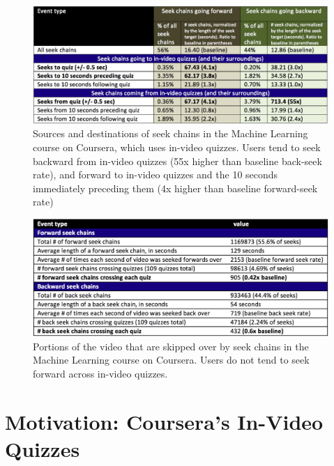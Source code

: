 \documentclass{sigchi}
\begin{document}
\begin{figure}
\includegraphics[width=1.0\columnwidth]{seek-sources-and-destinations-short}
\caption{Sources and destinations of seek chains in the Machine Learning course on Coursera, which uses in-video quizzes. Users tend to seek backward from in-video quizzes (55x higher than baseline back-seek rate), and forward to in-video quizzes and the 10 seconds immediately preceding them (4x higher than baseline forward-seek rate)}
\label{fig:seek-sources-and-destinations-short}
\end{figure}

\begin{figure}[h]
\includegraphics[width=1.0\columnwidth]{table-of-seeks-short}
\caption{Portions of the video that are skipped over by seek chains in the Machine Learning course on Coursera. Users do not tend to seek forward across in-video quizzes.}
\label{fig:table-of-seeks-short}
\end{figure}

\section{Motivation: Coursera's In-Video Quizzes}


\end{document}
